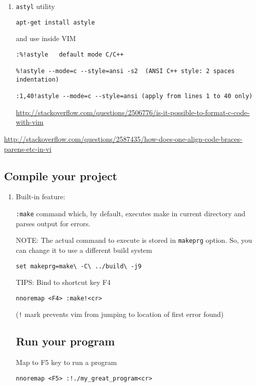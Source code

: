 \begin{enumerate}
  \item \verb!astyl! utility
\begin{verbatim}
apt-get install astyle
\end{verbatim}
and use inside VIM
\begin{verbatim}
:%!astyle   default mode C/C++

%!astyle --mode=c --style=ansi -s2  (ANSI C++ style: 2 spaces indentation)

:1,40!astyle --mode=c --style=ansi (apply from lines 1 to 40 only)
\end{verbatim}

\url{http://stackoverflow.com/questions/2506776/is-it-possible-to-format-c-code-with-vim}

\end{enumerate}
\url{http://stackoverflow.com/questions/2587435/how-does-one-align-code-braces-parens-etc-in-vi}

\subsection{Compile your project}


\begin{enumerate}
  \item Built-in feature:
  
\verb!:make! command which, by default, executes make in current directory and
parses output for errors.

NOTE: The actual command to execute is stored in \verb!makeprg! option.
So, you can change it to use a different build system
\begin{verbatim}
set makeprg=make\ -C\ ../build\ -j9
\end{verbatim}
 
TIPS: Bind to shortcut key F4
\begin{verbatim}
nnoremap <F4> :make!<cr>
\end{verbatim}
(\verb.!. mark prevents vim from jumping to location of first error found)

\subsection{Run your program}

Map to F5 key to run a program
\begin{verbatim}
nnoremap <F5> :!./my_great_program<cr>
\end{verbatim}
\end{enumerate}

